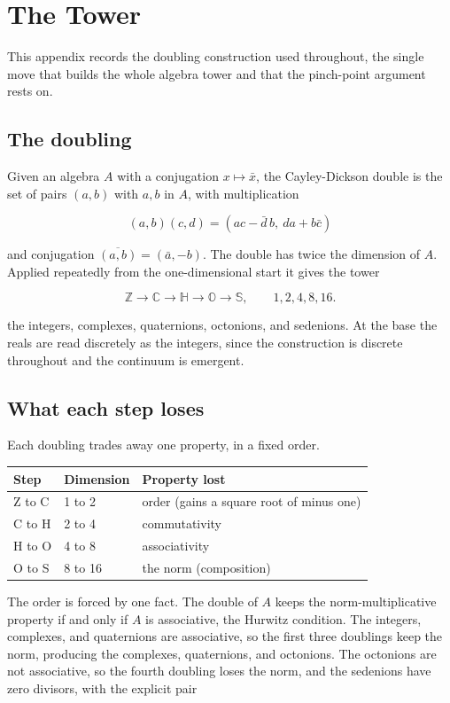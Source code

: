 \section{The Tower}

This appendix records the doubling construction used throughout, the single move that builds the whole algebra tower and that the pinch-point argument rests on.

\subsection*{The doubling}

Given an algebra $A$ with a conjugation $x \mapsto \bar{x}$, the Cayley-Dickson double is the set of pairs $(a, b)$ with $a, b$ in $A$, with multiplication

\[ (a, b)(c, d) = (ac - \bar{d}\,b,\ da + b\bar{c}) \]

and conjugation $\overline{(a, b)} = (\bar{a}, -b)$. The double has twice the dimension of $A$. Applied repeatedly from the one-dimensional start it gives the tower

\[ \mathbb{Z} \to \mathbb{C} \to \mathbb{H} \to \mathbb{O} \to \mathbb{S}, \qquad 1, 2, 4, 8, 16. \]

the integers, complexes, quaternions, octonions, and sedenions. At the base the reals are read discretely as the integers, since the construction is discrete throughout and the continuum is emergent.

\subsection*{What each step loses}

Each doubling trades away one property, in a fixed order.

\begin{center}
\begin{tabular}{lll}
Step & Dimension & Property lost \\
\hline
Z to C & 1 to 2 & order (gains a square root of minus one) \\
C to H & 2 to 4 & commutativity \\
H to O & 4 to 8 & associativity \\
O to S & 8 to 16 & the norm (composition) \\
\end{tabular}
\end{center}

The order is forced by one fact. The double of $A$ keeps the norm-multiplicative property if and only if $A$ is associative, the Hurwitz condition. The integers, complexes, and quaternions are associative, so the first three doublings keep the norm, producing the complexes, quaternions, and octonions. The octonions are not associative, so the fourth doubling loses the norm, and the sedenions have zero divisors, with the explicit pair

